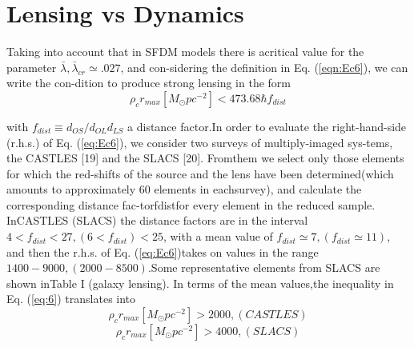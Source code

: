 \documentclass[9.5pt, twocolumn]{article}
\begin{document}
\section[III]{\centering \little Lensing vs Dynamics}

Taking into account that in SFDM models there is acritical value for the parameter \(\bar{\lambda} , \bar{\lambda}_{cr} \simeq .027\), and con-sidering the definition in Eq. (\ref{eqn:Ec6}), we can write the con-dition to produce strong lensing in the form \\
\begin{equation}
	\rho_{c} r_{max}[M_{\odot}pc^{-2}]  < 473.68 \hbar f_{dist}
	\label{eq:Ec7}
\end{equation}

with \(f_{dist}\equiv d_{OS}/d_{OL}d_{LS}\) a distance factor.In  order  to  evaluate  the  right-hand-side  (r.h.s.)    of Eq. (\ref{eq:Ec6}), we consider two surveys of multiply-imaged sys-tems,  the  CASTLES  [19]  and  the  SLACS  [20].   Fromthem  we  select  only  those  elements  for  which  the  red-shifts  of  the  source  and  the  lens  have  been  determined(which  amounts  to  approximately  60  elements  in  eachsurvey),  and  calculate  the  corresponding  distance  fac-torfdistfor  every  element  in  the  reduced  sample.   InCASTLES (SLACS) the distance factors are in the interval  \(4<f_{dist}<27, (6<f_{dist})<25\), with a mean value of \(f_{dist}\simeq 7, (f_{dist}\simeq 11)\), and then the r.h.s.  of Eq. (\ref{eq:Ec6})takes on values in the range \(1400-9000, (2000-8500)\).Some representative elements from SLACS are shown inTable  I  (galaxy  lensing).   In  terms  of  the  mean  values,the inequality in Eq. (\ref{eq:6}) translates into
 \begin{equation}
 	\rho_{c}r_{max}[M_{\odot}pc^{-2}]>2000, (CASTLES)
 	\label{eq:Ec8}
 \end{equation}
  \begin{equation}
 	\rho_{c}r_{max}[M_{\odot}pc^{-2}]>4000, (SLACS)
 	\label{Ec9}
 \end{equation}
 
\end{document}
